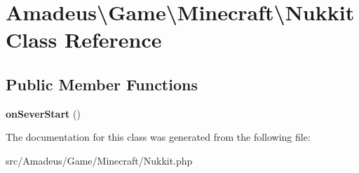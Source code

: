 \hypertarget{classAmadeus_1_1Game_1_1Minecraft_1_1Nukkit}{}\section{Amadeus\textbackslash{}Game\textbackslash{}Minecraft\textbackslash{}Nukkit Class Reference}
\label{classAmadeus_1_1Game_1_1Minecraft_1_1Nukkit}
\subsection*{Public Member Functions}
\begin{DoxyCompactItemize}
\item 
\mbox{\label{classAmadeus_1_1Game_1_1Minecraft_1_1Nukkit_ac5424696975f92b2b480824a7bc1f14d}} 
{\bfseries on\+Sever\+Start} ()
\end{DoxyCompactItemize}


The documentation for this class was generated from the following file\+:\begin{DoxyCompactItemize}
\item 
src/\+Amadeus/\+Game/\+Minecraft/Nukkit.\+php\end{DoxyCompactItemize}

